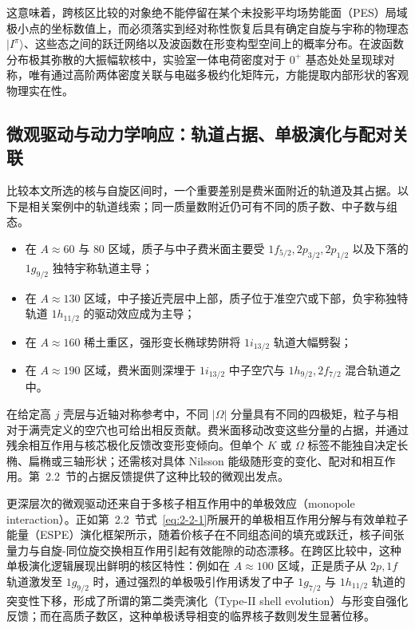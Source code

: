 这意味着，跨核区比较的对象绝不能停留在某个未投影平均场势能面（PES）局域极小点的坐标数值上，而必须落实到经对称性恢复后具有确定自旋与宇称的物理态 $|I^\pi\rangle$、这些态之间的跃迁网络以及波函数在形变构型空间上的概率分布。在波函数分布极其弥散的大振幅软核中，实验室一体电荷密度对于 $0^+$ 基态处处呈现球对称，唯有通过高阶两体密度关联与电磁多极约化矩阵元，方能提取内部形状的客观物理实在性\cite{poves-2020-limits-assigning-nuclear-shape}。

\subsection{微观驱动与动力学响应：轨道占据、单极演化与配对关联}\label{sec:4-1-2}

比较本文所选的核与自旋区间时，一个重要差别是费米面附近的轨道及其占据。以下是相关案例中的轨道线索；同一质量数附近仍可有不同的质子数、中子数与组态。
\begin{itemize}
\item 在 $A\approx 60$ 与 $80$ 区域，质子与中子费米面主要受 $1f_{5/2}, 2p_{3/2}, 2p_{1/2}$ 以及下落的 $1g_{9/2}$ 独特宇称轨道主导；
\item 在 $A\approx 130$ 区域，中子接近壳层中上部，质子位于准空穴或下部，负宇称独特轨道 $1h_{11/2}$ 的驱动效应成为主导；
\item 在 $A\approx 160$ 稀土重区，强形变长椭球势阱将 $1i_{13/2}$ 轨道大幅劈裂；
\item 在 $A\approx 190$ 区域，费米面则深埋于 $1i_{13/2}$ 中子空穴与 $1h_{9/2}, 2f_{7/2}$ 混合轨道之中。
\end{itemize}

在给定高 $j$ 壳层与近轴对称参考中，不同 $|\Omega|$ 分量具有不同的四极矩，粒子与相对于满壳定义的空穴也可给出相反贡献。费米面移动改变这些分量的占据，并通过残余相互作用与核芯极化反馈改变形变倾向。但单个 $K$ 或 $\Omega$ 标签不能独自决定长椭、扁椭或三轴形状；还需核对具体 Nilsson 能级随形变的变化、配对和相互作用。第~2.2~节的占据反馈提供了这种比较的微观出发点\cite{book-bohr-mottelson-nuclear-structure-vol2}。

更深层次的微观驱动还来自于多核子相互作用中的单极效应（monopole interaction）。正如第~2.2~节式~\eqref{eq:2-2-1}所展开的单极相互作用分解与有效单粒子能量（ESPE）演化框架所示，随着价核子在不同组态间的填充或跃迁，核子间张量力与自旋-同位旋交换相互作用引起有效能隙的动态漂移\cite{doctoral-r1-g28-otsuka-2023-type-ii-shell-evolution}。在跨区比较中，这种单极演化逻辑展现出鲜明的核区特性：例如在 $A\approx 100$ 区域，正是质子从 $2p, 1f$ 轨道激发至 $1g_{9/2}$ 时，通过强烈的单极吸引作用诱发了中子 $1g_{7/2}$ 与 $1h_{11/2}$ 轨道的突变性下移，形成了所谓的第二类壳演化（Type-II shell evolution）与形变自强化反馈\cite{doctoral-r1-g28-togashi-2016-zr-mcsm-qpt}；而在高质子数区，这种单极诱导相变的临界核子数则发生显著位移。

